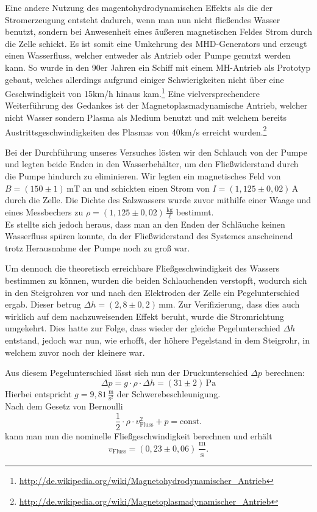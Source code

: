 \documentclass[11pt]{scrartcl}
\newcommand{\unit}[1]{\ensuremath{\,\mathrm{#1}}} %
\begin{document}
Eine andere Nutzung des magentohydrodynamischen Effekts als die der Stromerzeugung entsteht dadurch, wenn man nun nicht fließendes Wasser benutzt, sondern bei Anwesenheit eines äußeren magnetischen Feldes Strom durch die Zelle schickt. Es ist somit eine Umkehrung des MHD-Generators und erzeugt einen Wasserfluss, welcher entweder als Antrieb oder Pumpe genutzt werden kann. So wurde in den 90er Jahren ein Schiff mit einem MH-Antrieb als Prototyp gebaut, welches allerdings aufgrund einiger Schwierigkeiten nicht über eine Geschwindigkeit von 15km/h hinaus kam.\footnote{\url{http://de.wikipedia.org/wiki/Magnetohydrodynamischer\_Antrieb}} Eine vielversprechendere Weiterführung des Gedankes ist der Magnetoplasmadynamische Antrieb, welcher nicht Wasser sondern Plasma als Medium benutzt und mit welchem bereits Austrittsgeschwindigkeiten des Plasmas von 40km/s erreicht wurden.\footnote{\url{http://de.wikipedia.org/wiki/Magnetoplasmadynamischer\_Antrieb}}

Bei der Durchführung unseres Versuches lösten wir den Schlauch von der Pumpe und legten beide Enden in den Wasserbehälter, um den Fließwiderstand durch die Pumpe hindurch zu eliminieren. Wir legten ein magnetisches Feld von $ B = (150 \pm 1) \unit{mT} $ an und schickten einen Strom von $I = (1,125 \pm 0,02) \unit{A}$ durch die Zelle. Die Dichte des Salzwassers wurde zuvor mithilfe einer Waage und eines Messbechers zu $\rho = (1,125 \pm 0,02) \unit{\frac{kg}{\ell}}$ bestimmt.\\
Es stellte sich jedoch heraus, dass man an den Enden der Schläuche keinen Wasserfluss spüren konnte, da der Fließwiderstand des Systemes anscheinend trotz Herausnahme der Pumpe noch zu groß war.

Um dennoch die theoretisch erreichbare Fließgeschwindigkeit des Wassers bestimmen zu können, wurden die beiden Schlauchenden verstopft, wodurch sich in den Steigrohren vor und nach den Elektroden der Zelle ein Pegelunterschied ergab. Dieser betrug $\Delta h = (2,8 \pm 0,2) \unit{mm}$. Zur Verifizierung, dass dies auch wirklich auf dem nachzuweisenden Effekt beruht, wurde die Stromrichtung umgekehrt. Dies hatte zur Folge, dass wieder der gleiche Pegelunterschied $\Delta h$ entstand, jedoch war nun, wie erhofft, der höhere Pegelstand in dem Steigrohr, in welchem zuvor noch der kleinere war.

Aus diesem Pegelunterschied lässt sich nun der Druckunterschied $\Delta p$ berechnen:
\begin{equation}
\Delta p = g \cdot \rho \cdot \Delta h = (31 \pm 2) \unit{Pa}
\end{equation}
Hierbei entspricht $g = 9,81 \unit{\frac{m}{s^2}}$ der Schwerebeschleunigung.\\
Nach dem Gesetz von Bernoulli
\begin{equation}
\frac{1}{2}\cdot\rho\cdot v^2_{\text{Fluss}} + p = \text{const.}
\end{equation}
kann man nun die nominelle Fließgeschwindigkeit berechnen und erhält
\begin{equation}
v_{\text{Fluss}} = (0,23 \pm 0,06)\unit{\frac{m}{s}}.
\end{equation}
\end{document}
